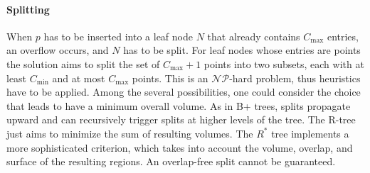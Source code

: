 \paragraph*{Splitting}
When $p$ has to be inserted into a leaf node $N$ that already contains $C_{\text{max}}$ entries, an overflow occurs, and $N$ has to be split. 
For leaf nodes whose entries are points the solution aims to split the set of $C_{\text{max}}+1$ points into two subsets, each with at least $C_{\text{min}}$ and at most $C_{\text{max}}$ points.
This is an $\mathcal{NP}$-hard problem, thus heuristics have to be applied. 
Among the several possibilities, one could consider the choice that leads to have a minimum overall volume. 
As in B+ trees, splits propagate upward and can recursively trigger splits at higher levels of the tree. 
The R-tree just aims to minimize the sum of resulting volumes. 
The $R^{*}$ tree implements a more sophisticated criterion, which takes into account the volume, overlap, and surface of the resulting regions.
An overlap-free split cannot be guaranteed.

